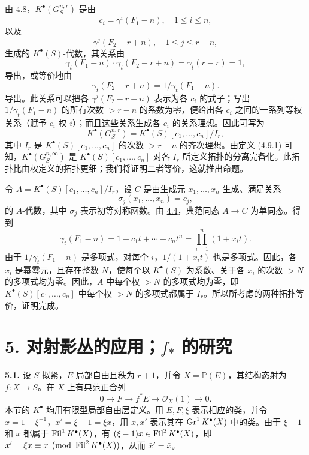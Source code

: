 由 \hyperlink{sga6.e06.cor.4-8}{4.8}，\(K^\bullet(G_S^{n,r})\) 是由
\[
  c_i=\gamma^i(F_1-n),\quad 1\le i\le n,
\]
以及
\[
  \gamma^j(F_2-r+n),\quad 1\le j\le r-n,
\]
生成的 \(K^\bullet(S)\)-代数，其关系由
\[
  \gamma_t(F_1-n)\cdot\gamma_t(F_2-r+n)
  = \gamma_t(r-r)=1,
\]
导出，或等价地由
\[
  \gamma_t(F_2-r+n)=1/\gamma_t(F_1-n).
\]
导出。此关系可以把各 \(\gamma^j(F_2-r+n)\) 表示为各 \(c_i\) 的式子；写出 \(1/\gamma_t(F_1-n)\) 的所有次数 \(>r-n\) 的系数为零，便给出各 \(c_i\) 之间的一系列等权关系（赋予 \(c_i\) 权 \(i\)）；而且这些关系生成各 \(c_i\) 的关系理想。因此可写为
\[
  K^\bullet(G_S^{n,r})=K^\bullet(S)[c_1,\ldots,c_n]/I_r,
\]
其中 \(I_r\) 是 \(K^\bullet(S)[c_1,\ldots,c_n]\) 的次数 \(>r-n\) 的齐次理想。由\hyperlink{sga6.e06.eq.4-9-1}{定义 (4.9.1)} 可知，\(K^\bullet(G_S^{n,\infty})\) 是 \(K^\bullet(S)[c_1,\ldots,c_n]\) 对各 \(I_r\) 所定义拓扑的分离完备化。此拓扑比由权定义的拓扑更细；我们将证明二者等价，这就推出命题。

令 \(A=K^\bullet(S)[c_1,\ldots,c_n]/I_r\)，设 \(C\) 是由生成元 \(x_1,\ldots,x_n\) 生成、满足关系
\[
  \sigma_j(x_1,\ldots,x_n)=c_j,
\]
的 \(A\)-代数，其中 \(\sigma_j\) 表示初等对称函数。由 \hyperlink{sga6.e06.cor.4-4}{4.4}，典范同态 \(A\to C\) 为单同态。得到
\[
  \gamma_t(F_1-n)
  =1+c_1t+\cdots+c_nt^n
  =\prod_{i=1}^n(1+x_it).
\]
由于 \(1/\gamma_t(F_1-n)\) 是多项式，对每个 \(i\)，\(1/(1+x_it)\) 也是多项式。因此，各 \(x_i\) 是幂零元，且存在整数 \(N\)，使每个以 \(K^\bullet(S)\) 为系数、关于各 \(x_i\) 的次数 \(>N\) 的多项式均为零。因此，\(A\) 中每个权 \(>N\) 的多项式均为零，即 \(K^\bullet(S)[c_1,\ldots,c_n]\) 中每个权 \(>N\) 的多项式都属于 \(I_r\)。所以所考虑的两种拓扑等价，证明完成。

\section*{5. 对射影丛的应用；\(f_*\) 的研究}

\noindent\textbf{5.1.}
设 \(S\) 拟紧，\(E\) 局部自由且秩为 \(r+1\)，并令 \(X=\mathbb P(E)\)，其结构态射为 \(f:X\to S\)。在 \(X\) 上有典范正合列
\[
  0\longrightarrow F\longrightarrow f^*E\longrightarrow \mathcal O_X(1)\longrightarrow 0.
\]
本节的 \(K^\bullet\) 均用有限型局部自由层定义。用 \(E,F,\xi\) 表示相应的类，并令 \(x=1-\xi^{-1}\)，\(x'=\xi-1=\xi x\)，用 \(\bar x,\bar x'\) 表示其在 \(\operatorname{Gr}^1K^\bullet(X)\) 中的类。由于 \(\xi-1\) 和 \(x\) 都属于 \(\operatorname{Fil}^1K^\bullet(X)\)，有 \((\xi-1)x\in\operatorname{Fil}^2K^\bullet(X)\)，即 \(x'=\xi x\equiv x\pmod{\operatorname{Fil}^2K^\bullet(X)}\)，从而 \(\bar x'=\bar x\)。

